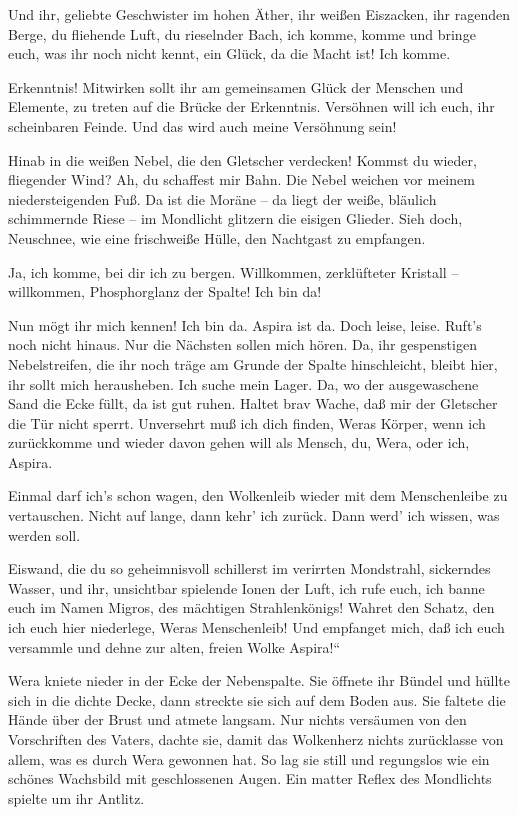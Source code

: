 Und ihr, geliebte Geschwister im hohen Äther, ihr weißen Eiszacken,
ihr ragenden Berge, du fliehende Luft, du rieselnder Bach, ich
komme, komme und bringe euch, was ihr noch nicht kennt, ein Glück,
da die Macht ist! Ich komme.

Erkenntnis! Mitwirken sollt ihr am gemeinsamen Glück der Menschen
und Elemente, zu treten auf die Brücke der Erkenntnis. Versöhnen
will ich euch, ihr scheinbaren Feinde. Und das wird auch meine
Versöhnung sein!

Hinab in die weißen Nebel, die den Gletscher verdecken! Kommst du
wieder, fliegender Wind? Ah, du schaffest mir Bahn. Die Nebel
weichen vor meinem niedersteigenden Fuß. Da ist die Moräne – da
liegt der weiße, bläulich schimmernde Riese – im Mondlicht glitzern
die eisigen Glieder. Sieh doch, Neuschnee, wie eine frischweiße
Hülle, den Nachtgast zu empfangen.

Ja, ich komme, bei dir ich zu bergen. Willkommen, zerklüfteter
Kristall – willkommen, Phosphorglanz der Spalte! Ich bin da!

Nun mögt ihr mich kennen! Ich bin da. Aspira ist da. Doch leise,
leise. Ruft's noch nicht hinaus. Nur die Nächsten sollen mich
hören. Da, ihr gespenstigen Nebelstreifen, die ihr noch träge am
Grunde der Spalte hinschleicht, bleibt hier, ihr sollt mich
herausheben. Ich suche mein Lager. Da, wo der ausgewaschene Sand
die Ecke füllt, da ist gut ruhen. Haltet brav Wache, daß mir der
Gletscher die Tür nicht sperrt. Unversehrt muß ich dich finden,
Weras Körper, wenn ich zurückkomme und wieder davon gehen will als
Mensch, du, Wera, oder ich, Aspira.

Einmal darf ich's schon wagen, den Wolkenleib wieder mit dem
Menschenleibe zu vertauschen. Nicht auf lange, dann kehr' ich
zurück. Dann werd' ich wissen, was werden soll.

Eiswand, die du so geheimnisvoll schillerst im verirrten
Mondstrahl, sickerndes Wasser, und ihr, unsichtbar spielende Ionen
der Luft, ich rufe euch, ich banne euch im Namen Migros, des
mächtigen Strahlenkönigs! Wahret den Schatz, den ich euch hier
niederlege, Weras Menschenleib! Und empfanget mich, daß ich euch
versammle und dehne zur alten, freien Wolke Aspira!“

Wera kniete nieder in der Ecke der Nebenspalte. Sie öffnete ihr
Bündel und hüllte sich in die dichte Decke, dann streckte sie sich
auf dem Boden aus. Sie faltete die Hände über der Brust und atmete
langsam. Nur nichts versäumen von den Vorschriften des Vaters,
dachte sie, damit das Wolkenherz nichts zurücklasse von allem, was
es durch Wera gewonnen hat. So lag sie still und regungslos wie ein
schönes Wachsbild mit geschlossenen Augen. Ein matter Reflex des
Mondlichts spielte um ihr Antlitz.

